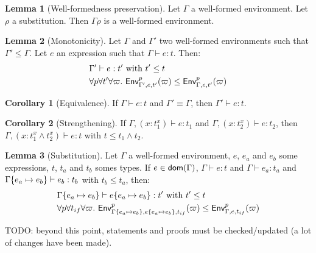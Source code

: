 \documentclass[a4paper]{article}
\theoremstyle{definition}
\newtheorem{lemma}{Lemma}
\newtheorem{corollary}{Corollary}
\begin{document}
        \begin{lemma}[Well-formedness preservation]
          Let $\Gamma$ a well-formed environment. Let $\rho$ a substitution.
          Then $\Gamma\rho$ is a well-formed environment.
        \end{lemma}
    
        \begin{lemma}[Monotonicity]
          Let $\Gamma$ and $\Gamma'$ two well-formed environments such that $\Gamma' \leq \Gamma$. Let $e$ an expression such that $\Gamma \vdash e:t$.
          Then:\\
          \begin{align*}
            &\Gamma' \vdash e:t' \text{ with } t' \leq t\\
            &\forall p \forall t' \forall \varpi.\ \textsf{Env}^{p}_{\Gamma',e,t'} (\varpi) \leq \textsf{Env}^{p}_{\Gamma,e,t'} (\varpi)
          \end{align*}
        \end{lemma}
    
        \begin{corollary}[Equivalence]
          If $\Gamma \vdash e:t$ and $\Gamma' \equiv \Gamma$, then $\Gamma' \vdash e:t$.
        \end{corollary}
    
        \begin{corollary}[Strengthening]
          If $\Gamma, (x:t_1^x) \vdash e:t_1$ and $\Gamma, (x:t_2^x) \vdash e:t_2$, then
          $\Gamma, (x:t_1^x\land t_2^x) \vdash e:t$ with $t \leq t_1\land t_2$.
        \end{corollary}
    
        \begin{lemma}[Substitution]
          Let $\Gamma$ a well-formed environment, $e$, $e_a$ and $e_b$ some expressions, $t$, $t_a$ and $t_b$ somes types.
          If $e \in \textsf{dom}(\Gamma)$, $\Gamma \vdash e:t$ and $\Gamma \vdash e_a : t_a$ and $\Gamma\{e_a \mapsto e_b\} \vdash e_b:t_b$ with $t_b \leq t_a$, then:
          \begin{align*}
            &\Gamma \{e_a \mapsto e_b\} \vdash e \{e_a \mapsto e_b\}:t' \text{ with } t'\leq t\\
            &\forall p \forall t_{if} \forall \varpi.\ \textsf{Env}^{p}_{\Gamma\{e_a \mapsto e_b\},e\{e_a \mapsto e_b\},t_{if}} (\varpi) \leq \textsf{Env}^{p}_{\Gamma,e,t_{if}} (\varpi)
          \end{align*}
        \end{lemma}
    
        TODO: beyond this point, statements and proofs must be checked/updated (a lot of changes have been made).
\end{document}
